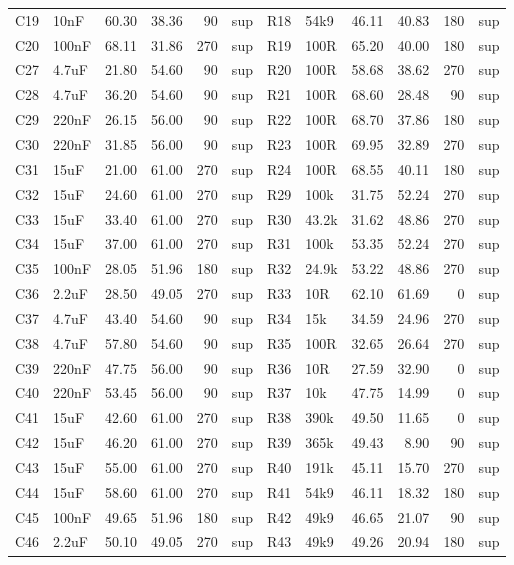 \documentclass[10pt,a4paper]{article}
\begin{document}
{\begin{longtable}{@{}llrrrl|llrrrl@{}}
C19 & 10nF & 60.30 & 38.36 & 90 & sup & R18 & 54k9 & 46.11 & 40.83 & 180 & sup\\
C20 & 100nF & 68.11 & 31.86 & 270 & sup & R19 & 100R & 65.20 & 40.00 & 180 & sup\\
C27 & 4.7uF & 21.80 & 54.60 & 90 & sup & R20 & 100R & 58.68 & 38.62 & 270 & sup\\
C28 & 4.7uF & 36.20 & 54.60 & 90 & sup & R21 & 100R & 68.60 & 28.48 & 90 & sup\\
C29 & 220nF & 26.15 & 56.00 & 90 & sup & R22 & 100R & 68.70 & 37.86 & 180 & sup\\
C30 & 220nF & 31.85 & 56.00 & 90 & sup & R23 & 100R & 69.95 & 32.89 & 270 & sup\\
C31 & 15uF & 21.00 & 61.00 & 270 & sup & R24 & 100R & 68.55 & 40.11 & 180 & sup\\
C32 & 15uF & 24.60 & 61.00 & 270 & sup & R29 & 100k & 31.75 & 52.24 & 270 & sup\\
C33 & 15uF & 33.40 & 61.00 & 270 & sup & R30 & 43.2k & 31.62 & 48.86 & 270 & sup\\
C34 & 15uF & 37.00 & 61.00 & 270 & sup & R31 & 100k & 53.35 & 52.24 & 270 & sup\\
C35 & 100nF & 28.05 & 51.96 & 180 & sup & R32 & 24.9k & 53.22 & 48.86 & 270 & sup\\
C36 & 2.2uF & 28.50 & 49.05 & 270 & sup & R33 & 10R & 62.10 & 61.69 & 0 & sup\\
C37 & 4.7uF & 43.40 & 54.60 & 90 & sup & R34 & 15k & 34.59 & 24.96 & 270 & sup\\
C38 & 4.7uF & 57.80 & 54.60 & 90 & sup & R35 & 100R & 32.65 & 26.64 & 270 & sup\\
C39 & 220nF & 47.75 & 56.00 & 90 & sup & R36 & 10R & 27.59 & 32.90 & 0 & sup\\
C40 & 220nF & 53.45 & 56.00 & 90 & sup & R37 & 10k & 47.75 & 14.99 & 0 & sup\\
C41 & 15uF & 42.60 & 61.00 & 270 & sup & R38 & 390k & 49.50 & 11.65 & 0 & sup\\
C42 & 15uF & 46.20 & 61.00 & 270 & sup & R39 & 365k & 49.43 & 8.90 & 90 & sup\\
C43 & 15uF & 55.00 & 61.00 & 270 & sup & R40 & 191k & 45.11 & 15.70 & 270 & sup\\
C44 & 15uF & 58.60 & 61.00 & 270 & sup & R41 & 54k9 & 46.11 & 18.32 & 180 & sup\\
C45 & 100nF & 49.65 & 51.96 & 180 & sup & R42 & 49k9 & 46.65 & 21.07 & 90 & sup\\
C46 & 2.2uF & 50.10 & 49.05 & 270 & sup & R43 & 49k9 & 49.26 & 20.94 & 180 & sup\\

\end{longtable}}
\end{document}
